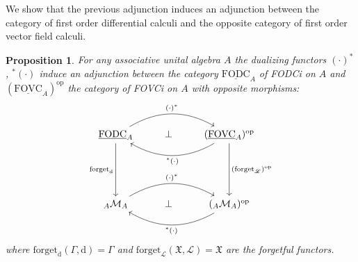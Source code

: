 \documentclass{article}
\newtheorem{proposition}[thm]{Proposition}
\theoremstyle{definition}
\begin{document}
	We show that the previous adjunction induces an adjunction between the category of first order differential calculi and the opposite category of first order vector field calculi.
	\begin{proposition}\label{prop:Adjoint}
		For any associative unital algebra $A$ the dualizing functors $(\cdot)^*$, ${}^*(\cdot)$
		induce an adjunction between the category $\underline{\mathrm{FODC}}_A$ of FODCi on $A$ and $(\underline{\mathrm{FOVC}}_A)^\mathrm{op}$ the category of {FOVCi} on $A$ with opposite morphisms:
		\begin{equation*}
			\begin{tikzcd}
				\underline{\mathrm{FODC}}_A \arrow[rr, bend left, "(\cdot)^*"] \arrow{ddd}[swap]{\mathrm{forget}_\mathrm{d}} & \perp & (\underline{\mathrm{FOVC}}_A)^\mathrm{op} \arrow[ll, bend left, "{}^*(\cdot)"] \arrow{ddd}{(\mathrm{forget}_\mathscr{L})^\mathrm{op}}\\
				& & \\
				& & \\
				{}_A\mathcal{M}_A \arrow[rr, bend left, "(\cdot)^*"] & \perp & ({}_A\mathcal{M}_A)^\mathrm{op} \arrow[ll, bend left, "{}^*(\cdot)"]
			\end{tikzcd}
		\end{equation*}
		where
		$\mathrm{forget}_\mathrm{d}(\Gamma,\mathrm{d})=\Gamma$ and $\mathrm{forget}_\mathscr{L}(\mathfrak{X},\mathscr{L})=\mathfrak{X}$
		are the forgetful functors.
	\end{proposition}
	
\end{document}
